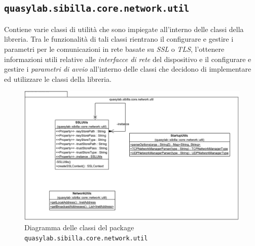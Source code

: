 \subsection{\texttt{quasylab.sibilla.core.network.util}} Contiene varie classi di utilità che sono impiegate all’interno delle classi della libreria. Tra le funzionalità di tali classi rientrano il configurare e gestire i parametri per le comunicazioni in rete basate su \emph{SSL} o \emph{TLS}, l’ottenere informazioni utili relative alle \emph{interfacce di rete} del dispositivo e il configurare e gestire i \emph{parametri di avvio} all’interno delle classi che decidono di implementare ed utilizzare le classi della libreria.

\begin{figure}[H]
    \includegraphics[width=\linewidth]{images/quasylab.sibilla.core.network.util.png}
    \captionsetup{justification=centering}
    \caption{Diagramma delle classi del package \texttt{quasylab.sibilla.core.network.util}}
  \end{figure}













